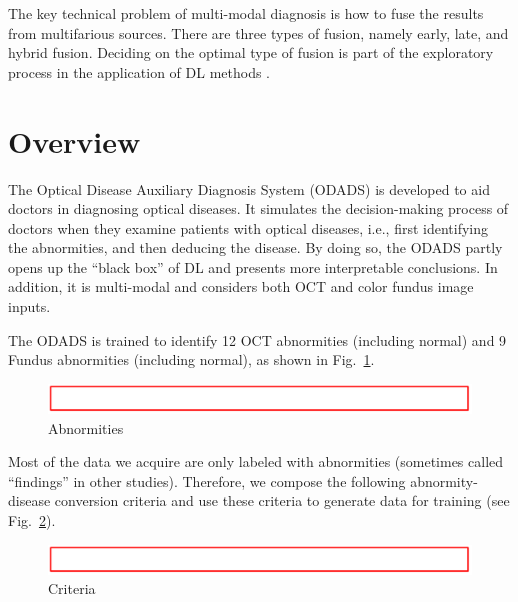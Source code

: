 \documentclass{article}
\begin{document}
		The key technical problem of multi-modal diagnosis is how to fuse the results from multifarious sources.  There are three types of fusion, namely early, late, and hybrid fusion.  Deciding on the optimal type of fusion is part of the exploratory process in the application of DL methods \autocite{Ichhpujani_Thakur_2021}.
		
		
	
	\section{Overview}
		
		The Optical Disease Auxiliary Diagnosis System (ODADS) is developed to aid doctors in diagnosing optical diseases. It simulates the decision-making process of doctors when they examine patients with optical diseases, i.e., first identifying the abnormities, and then deducing the disease. By doing so, the ODADS partly opens up the ``black box'' of DL and presents more interpretable conclusions. In addition, it is multi-modal and considers both OCT and color fundus image inputs. 
		
		The ODADS is trained to identify 12 OCT abnormities (including normal) and 9 Fundus abnormities (including normal), as shown in Fig.~\ref{fig:abnormities}.
		
		\begin{figure}[htbp]
			\centering
			\includegraphics[width=\linewidth]{Figs/Temp.png}
			\caption{Abnormities}
			\vspace{0.3cm}
			\label{fig:abnormities}
		\end{figure}
		
		Most of the data we acquire are only labeled with abnormities (sometimes called ``findings'' in other studies). Therefore, we compose the following abnormity-disease conversion criteria and use these criteria to generate data for training (see Fig.~\ref{fig:criteria}). 
		
		\begin{figure}[htbp]
			\centering
			\includegraphics[width=\linewidth]{Figs/Temp.png}
			\caption{Criteria}
			\vspace{0.3cm}
			\label{fig:criteria}
		\end{figure}
		
\end{document}
